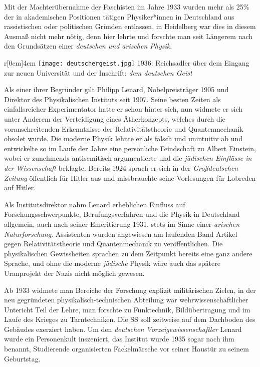 Mit der Machterübernahme der Faschisten im Jahre 1933 wurden mehr als 25\% der in akademischen Positionen tätigen Physiker*innen in Deutschland aus rassistischen oder politischen Gründen entlassen, in Heidelberg war dies in diesem Ausmaß nicht mehr nötig, denn hier lehrte und forschte man seit Längerem nach den Grundsätzen einer \textit{deutschen und arischen Physik}.

\begin{wrapfigure}{r}[0cm]{4cm}
\texttt{[image: deutschergeist.jpg]}
\small{1936: Reichsadler über dem Eingang zur neuen Universität und der Inschrift: \textit{dem deutschen Geist}}
\vspace{-15pt}
\end{wrapfigure}

Als einer ihrer Begründer gilt Philipp Lenard, Nobelpreisträger 1905 und Direktor des Physikalischen Instituts seit 1907. 
Seine besten Zeiten als einfallsreicher Experimentator hatte er schon hinter sich, nun widmete er sich unter Anderem der Verteidigung eines Ätherkonzepts, welches durch die voranschreitenden Erkenntnisse der Relativitätstheorie und Quantenmechanik obsolet wurde. Die moderne Physik lehnte er als falsch und unintuitiv ab und entwickelte so im Laufe der Jahre eine persönliche Feindschaft zu Albert Einstein, wobei er zunehmends antisemitisch argumentierte und die \textit{jüdischen Einflüsse in der Wissenschaft} beklagte. Bereits 1924 sprach er sich in der \textit{Großdeutschen Zeitung} öffentlich für Hitler aus und missbrauchte seine Vorlesungen für Lobreden auf Hitler.

Als Institutsdirektor nahm Lenard erheblichen Einfluss auf Forschungsschwerpunkte, Berufungsverfahren und die Physik in Deutschland allgemein, auch nach seiner Emeritierung 1931, stets im Sinne einer \textit{arischen Naturforschung}. Assistenten wurden angewiesen am laufenden Band Artikel gegen Relativitätstheorie und Quantenmechanik zu veröffentlichen. Die physikalischen Gewissheiten sprachen zu dem Zeitpunkt bereits eine ganz andere Sprache, und ohne die moderne \textit{jüdische} Physik wäre auch das spätere Uranprojekt der Nazis nicht möglich gewesen. 

Ab 1933 widmete man Bereiche der Forschung explizit militärischen Zielen, in der neu gegründeten physikalisch-technischen Abteilung war wehrwissenschaftlicher Untericht Teil der Lehre, man forschte zu Funktechnik, Bildübertragung und im Laufe des Krieges zu Tarntechniken. Die SS soll zeitweise auf dem Dachboden des Gebäudes exerziert haben.
Um den \textit{deutschen Vorzeigewissenschaftler} Lenard wurde ein Personenkult inszeniert, das Institut wurde 1935 sogar nach ihm benannt, Studierende organisierten Fackelmärsche vor seiner Haustür zu seinem Geburtstag. 

